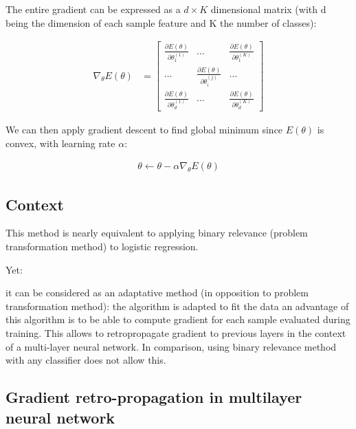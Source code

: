 The entire gradient can be expressed as a $d \times K$ dimensional matrix (with d being the dimension of each sample feature and K the number of classes):

\begin{align}
	\nabla_\theta E(\theta) 
	&= 
	\begin{bmatrix}
		\frac{\partial E(\theta)}{\partial \theta_1^{(1)}} 	& \dots 						& \frac{\partial E(\theta)}{\partial \theta_1^{(K)}} \\
		\dots 												&  \frac{\partial E(\theta)}{\partial \theta_i^{(j)}} 	& \dots \\
		\frac{\partial E(\theta)}{\partial \theta_d^{(1)}} 	& \dots 						& \frac{\partial E(\theta)}{\partial \theta_d^{(K)}}
	\end{bmatrix} 
\end{align}

We can then apply gradient descent to find global minimum since $E(\theta)$ is convex, with learning rate $\alpha$:

\begin{align}
	\theta \leftarrow \theta - \alpha \nabla_\theta E(\theta)
\end{align}



\subsection*{Context}

This method is nearly equivalent to applying binary relevance (problem transformation method) to logistic regression.

Yet:
\begin{outline}
\1 it can be considered as an adaptative method (in opposition to problem transformation method): the algorithm is adapted to fit the data
\1 an advantage of this algorithm is to be able to compute gradient for each sample evaluated during training. This allows to retropropagate gradient to previous layers in the context of a multi-layer neural network. In comparison, using binary relevance method with any classifier does not allow this.
\end{outline}








\pagebreak

\subsection*{Gradient retro-propagation in multilayer neural network}

